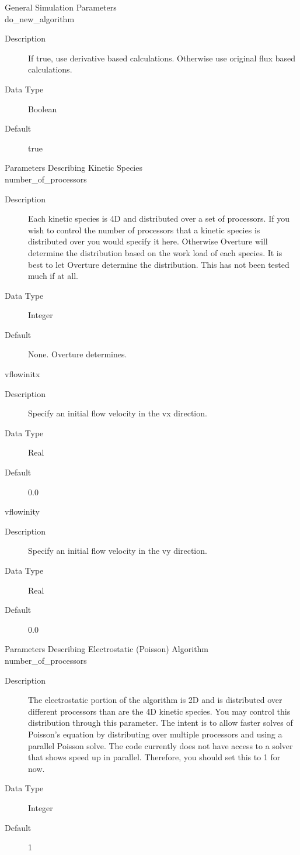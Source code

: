 \documentclass[11pt]{amsart}
\begin{document}
\noindent General Simulation Parameters \\
\indent do\_new\_algorithm
\begin{description}
\item [Description] If true, use derivative based calculations.  Otherwise use
original flux based calculations.
\item [Data Type] Boolean
\item [Default] true
\end{description}

\noindent Parameters Describing Kinetic Species \\
\indent number\_of\_processors
\begin{description}
\item [Description] Each kinetic species is 4D and distributed over a set of
processors.  If you wish to control the number of processors that a kinetic
species is distributed over you would specify it here.  Otherwise Overture
will determine the distribution based on the work load of each species.  It
is best to let Overture determine the distribution.  This has not been
tested much if at all.
\item [Data Type] Integer
\item [Default] None.  Overture determines.
\end{description}

vflowinitx
\begin{description}
\item [Description] Specify an initial flow velocity in the vx direction.
\item [Data Type] Real
\item [Default] 0.0
\end{description}

vflowinity
\begin{description}
\item [Description] Specify an initial flow velocity in the vy direction.
\item [Data Type] Real
\item [Default] 0.0
\end{description}

\noindent Parameters Describing Electrostatic (Poisson) Algorithm \\
\indent number\_of\_processors
\begin{description}
\item [Description] The electrostatic portion of the algorithm is 2D and is
distributed over different processors than are the 4D kinetic species.  You
may control this distribution through this parameter.  The intent is to
allow faster solves of Poisson's equation by distributing over multiple
processors and using a parallel Poisson solve.  The code currently does not
have access to a solver that shows speed up in parallel.  Therefore, you
should set this to 1 for now.
\item [Data Type] Integer
\item [Default] 1
\end{description}
\end{document}
